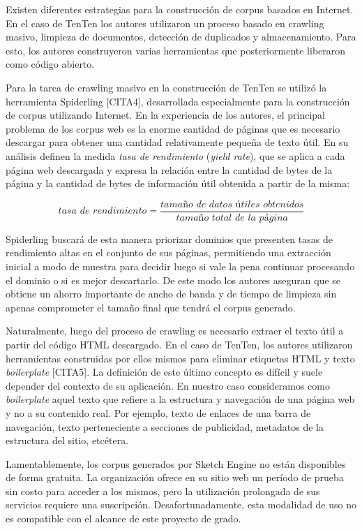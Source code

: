 Existen diferentes estrategias para la construcción de corpus basados en Internet. En el caso de TenTen
los autores utilizaron un proceso basado en crawling masivo, limpieza de documentos, detección de
duplicados y almacenamiento. Para esto, los autores construyeron varias herramientas que posteriormente
liberaron como código abierto.

Para la tarea de crawling masivo en la construcción de TenTen se utilizó la herramienta Spiderling
[CITA4], desarrollada especialmente para la construcción de corpus utilizando Internet. En la experiencia
de los autores, el principal problema de los corpus web es la enorme cantidad de páginas que es necesario
descargar para obtener una cantidad relativamente pequeña de texto útil. En su análisis definen la
medida \textit{tasa de rendimiento} (\textit{yield rate}), que se aplica a cada página web descargada y
expresa la relación entre la cantidad de bytes de la página y la cantidad de bytes de información útil
obtenida a partir de la misma:

\[
  \textit{tasa de rendimiento} = \frac{\textit{tamaño de datos útiles obtenidos}}{\textit{tamaño total de la página}}
\]

Spiderling buscará de esta manera priorizar dominios que presenten tasas de rendimiento altas en el
conjunto de sus páginas, permitiendo una extracción inicial a modo de muestra para decidir luego si
vale la pena continuar procesando el dominio o si es mejor descartarlo. De este modo los autores aseguran
que se obtiene un ahorro importante de ancho de banda y de tiempo de limpieza sin apenas comprometer
el tamaño final que tendrá el corpus generado.

Naturalmente, luego del proceso de crawling es necesario extraer el texto útil a partir del código
HTML descargado. En el caso de TenTen, los autores utilizaron herramientas construidas por ellos mismos
para eliminar etiquetas HTML y texto \textit{boilerplate} [CITA5]. La definición de este último concepto
es difícil y suele depender del contexto de su aplicación. En nuestro caso consideramos como
\textit{boilerplate} aquel texto que refiere a la estructura y navegación de una página web y no a su
contenido real. Por ejemplo, texto de enlaces de una barra de navegación, texto perteneciente a secciones
de publicidad, metadatos de la estructura del sitio, etcétera.

Lamentablemente, los corpus generados por Sketch Engine no están disponibles de forma gratuita. La
organización ofrece en su sitio web un período de prueba sin costo para acceder a los mismos, pero la
utilización prolongada de sus servicios requiere una suscripción. Desafortunadamente, esta modalidad de
uso no es compatible con el alcance de este proyecto de grado.

